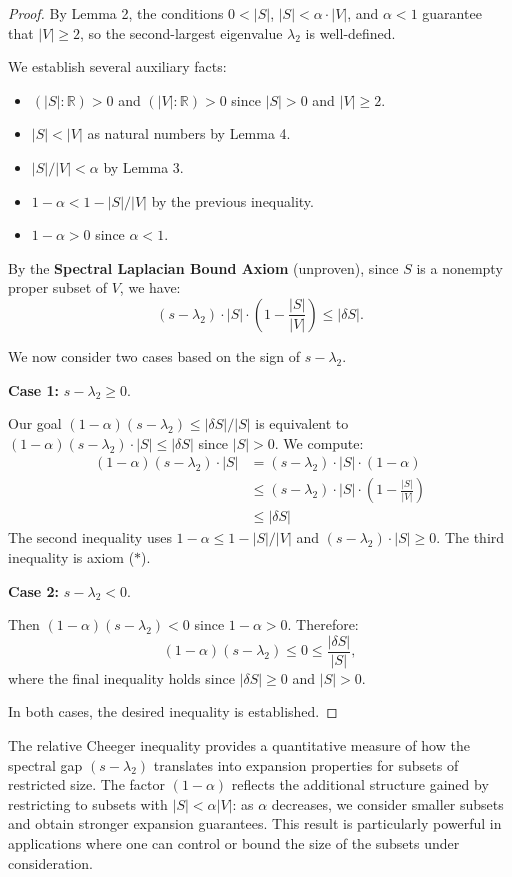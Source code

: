 \documentclass[11pt]{article}
\theoremstyle{plain}
\theoremstyle{definition}
\theoremstyle{remark}
\begin{document}
\begin{proof}
By Lemma 2, the conditions $0 < |S|$, $|S| < \alpha \cdot |V|$, and $\alpha < 1$ guarantee that $|V| \geq 2$, so the second-largest eigenvalue $\lambda_2$ is well-defined.

We establish several auxiliary facts:
\begin{itemize}
\item $(|S| : \mathbb{R}) > 0$ and $(|V| : \mathbb{R}) > 0$ since $|S| > 0$ and $|V| \geq 2$.
\item $|S| < |V|$ as natural numbers by Lemma 4.
\item $|S|/|V| < \alpha$ by Lemma 3.
\item $1 - \alpha < 1 - |S|/|V|$ by the previous inequality.
\item $1 - \alpha > 0$ since $\alpha < 1$.
\end{itemize}

By the \textbf{Spectral Laplacian Bound Axiom} (unproven), since $S$ is a nonempty proper subset of $V$, we have:
\[
(s - \lambda_2) \cdot |S| \cdot \left(1 - \frac{|S|}{|V|}\right) \leq |\delta S|. \tag{$*$}
\]

We now consider two cases based on the sign of $s - \lambda_2$.

\textbf{Case 1:} $s - \lambda_2 \geq 0$.

Our goal $(1 - \alpha)(s - \lambda_2) \leq |\delta S|/|S|$ is equivalent to $(1 - \alpha)(s - \lambda_2) \cdot |S| \leq |\delta S|$ since $|S| > 0$. We compute:
\begin{align}
(1 - \alpha)(s - \lambda_2) \cdot |S| &= (s - \lambda_2) \cdot |S| \cdot (1 - \alpha) \\
&\leq (s - \lambda_2) \cdot |S| \cdot \left(1 - \frac{|S|}{|V|}\right) \\
&\leq |\delta S|
\end{align}
The second inequality uses $1 - \alpha \leq 1 - |S|/|V|$ and $(s - \lambda_2) \cdot |S| \geq 0$. The third inequality is axiom ($*$).

\textbf{Case 2:} $s - \lambda_2 < 0$.

Then $(1 - \alpha)(s - \lambda_2) < 0$ since $1 - \alpha > 0$. Therefore:
\[
(1 - \alpha)(s - \lambda_2) \leq 0 \leq \frac{|\delta S|}{|S|},
\]
where the final inequality holds since $|\delta S| \geq 0$ and $|S| > 0$.

In both cases, the desired inequality is established.
\end{proof}

The relative Cheeger inequality provides a quantitative measure of how the spectral gap $(s - \lambda_2)$ translates into expansion properties for subsets of restricted size. The factor $(1 - \alpha)$ reflects the additional structure gained by restricting to subsets with $|S| < \alpha |V|$: as $\alpha$ decreases, we consider smaller subsets and obtain stronger expansion guarantees. This result is particularly powerful in applications where one can control or bound the size of the subsets under consideration.
\end{document}
